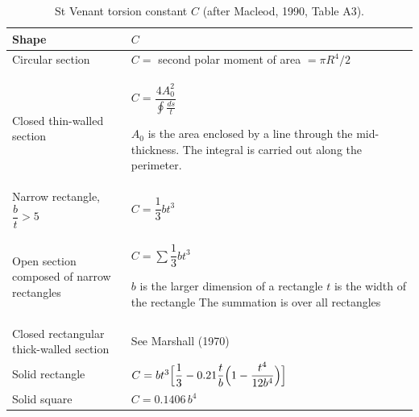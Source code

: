 \begin{table}[H]
  \centering\small
  \caption{St Venant torsion constant $C$ (after Macleod, 1990, Table A3).}
  \renewcommand{\arraystretch}{1.2}
  \begin{tabular}{@{}>{\raggedright\arraybackslash}p{}>{\raggedright\arraybackslash}p{}@{}}
    \toprule
    Shape & $C$\\
    \midrule
    Circular section & $C =$ second polar moment of area $= \pi R^4/2$\\[4pt]
    Closed thin-walled section & $C = \dfrac{4A_0^2}{\displaystyle\oint\frac{ds}{t}}$\rule[-22pt]{0pt}{44pt}\newline
      $A_0$ is the area enclosed by a line through the mid-thickness.\newline
      The integral is carried out along the perimeter.\\[6pt]
    Narrow rectangle, $\dfrac bt > 5$ & \qquad $C = \dfrac13 bt^3$\rule[-10pt]{0pt}{26pt}\\[6pt]
    Open section composed of narrow rectangles & $C = \sum\dfrac13 bt^3$\rule[-10pt]{0pt}{24pt}\newline
      $b$ is the larger dimension of a rectangle\newline
      $t$ is the width of the rectangle\newline
      The summation is over all rectangles\\[6pt]
    Closed rectangular thick-walled section & See Marshall (1970)\\[6pt]
    Solid rectangle & \rule[-14pt]{0pt}{20pt}\newline
      $C = bt^3\Bigl[\dfrac13 - 0.21\dfrac tb\Bigl(1-\dfrac{t^4}{12b^4}\Bigr)\Bigr]$\rule[-12pt]{0pt}{30pt}\\[6pt]
    Solid square & \qquad $C = 0.1406\,b^4$\rule[-14pt]{0pt}{30pt}\\
    \bottomrule
  \end{tabular}
\end{table}
